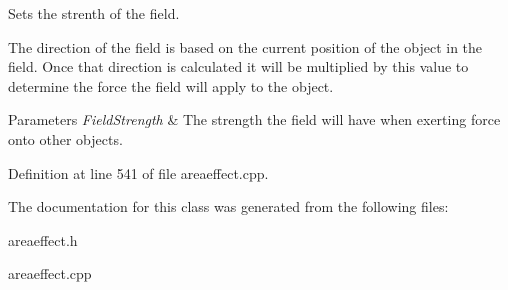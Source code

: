 Sets the strenth of the field. 

The direction of the field is based on the current position of the object in the field. Once that direction is calculated it will be multiplied by this value to determine the force the field will apply to the object. 
\begin{DoxyParams}{Parameters}
{\em FieldStrength} & The strength the field will have when exerting force onto other objects. \\
\hline
\end{DoxyParams}


Definition at line 541 of file areaeffect.cpp.



The documentation for this class was generated from the following files:\begin{DoxyCompactItemize}
\item 
areaeffect.h\item 
areaeffect.cpp\end{DoxyCompactItemize}
